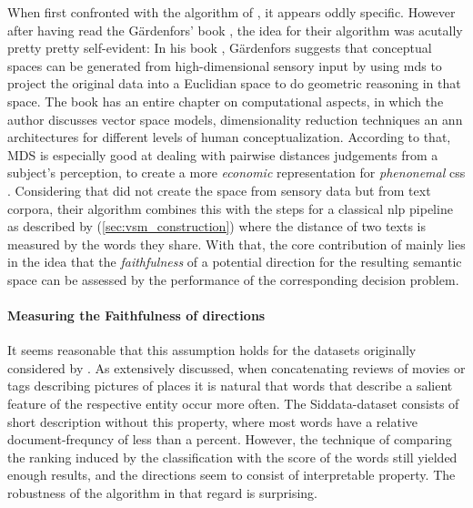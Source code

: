 When first confronted with the algorithm of \textcite{Derrac2015}, it appears oddly specific. However after having read the Gärdenfors' book \textcite{Gardenfors2000a}, the idea for their algorithm was acutally pretty pretty self-evident: In his book \cite{Gardenfors2000}, Gärdenfors suggests that conceptual spaces can be generated from high-dimensional sensory input by using \gls{mds} to project the original data into a Euclidian space to do geometric reasoning in that space. The book has an entire chapter on computational aspects, in which the author discusses vector space models, dimensionality reduction techniques an \gls{ann} architectures for different levels of human conceptualization. According to that, MDS is especially good at dealing with pairwise distances judgements from a subject's perception, to create a more \textit{economic} representation for \textit{phenonemal} \glspl{cs} \cite[221]{Gardenfors2000a}. Considering that \textcite{Derrac2015} did not create the space from sensory data but from text corpora, their algorithm combines this with the steps for a classical \gls{nlp} pipeline as described by \cite{Turney2010} (\autoref{sec:vsm_construction}) where the distance of two texts is measured by the words they share. With that, the core contribution of \cite{Derrac2015} mainly lies in the idea that the \textit{faithfulness} of a potential direction for the resulting semantic space can be assessed by the performance of the corresponding decision problem.

\paragraph{Measuring the Faithfulness of directions}

It seems reasonable that this assumption holds for the datasets originally considered by \textcite{Derrac2015}. As extensively discussed, when concatenating reviews of movies or tags describing pictures of places it is natural that words that describe a salient feature of the respective entity occur more often. The Siddata-dataset consists of short description without this property, where most words have a relative document-frequncy of less than a percent. However, the technique of comparing the ranking induced by the classification with the score of the words still yielded enough results, and the directions seem to consist of interpretable property. The robustness of the algorithm in that regard is surprising. 


